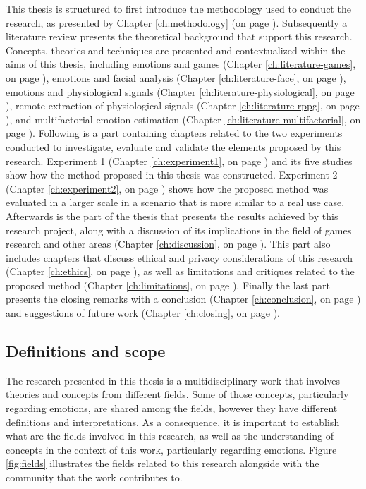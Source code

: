 This thesis is structured to first introduce the methodology used to conduct the research, as presented by Chapter \ref{ch:methodology} (on page \pageref{ch:methodology}). Subsequently a literature review presents the theoretical background that support this research. Concepts, theories and techniques are presented and contextualized within the aims of this thesis, including emotions and games (Chapter \ref{ch:literature-games}, on page \pageref{ch:literature-games}), emotions and facial analysis (Chapter \ref{ch:literature-face}, on page \pageref{ch:literature-face}), emotions and physiological signals (Chapter \ref{ch:literature-physiological}, on page \pageref{ch:literature-physiological}), remote extraction of physiological signals (Chapter \ref{ch:literature-rppg}, on page \pageref{ch:literature-rppg}), and multifactorial emotion estimation (Chapter \ref{ch:literature-multifactorial}, on page \pageref{ch:literature-multifactorial}). Following is a part containing chapters related to the two experiments conducted to investigate, evaluate and validate the elements proposed by this research. Experiment 1 (Chapter \ref{ch:experiment1}, on page \pageref{ch:experiment1}) and its five studies show how the method proposed in this thesis was constructed. Experiment 2 (Chapter \ref{ch:experiment2}, on page \pageref{ch:experiment2}) shows how the proposed method was evaluated in a larger scale in a scenario that is more similar to a real use case. Afterwards is the part of the thesis that presents the results achieved by this research project, along with a discussion of its implications in the field of games research and other areas (Chapter \ref{ch:discussion}, on page \pageref{ch:discussion}). This part also includes chapters that discuss ethical and privacy considerations of this research (Chapter \ref{ch:ethics}, on page \pageref{ch:ethics}), as well as limitations and critiques related to the proposed method (Chapter \ref{ch:limitations}, on page \pageref{ch:limitations}). Finally the last part presents the closing remarks with a conclusion (Chapter \ref{ch:conclusion}, on page \pageref{ch:conclusion}) and suggestions of future work (Chapter \ref{ch:closing}, on page \pageref{ch:closing}).

\subsection{Definitions and scope}

The research presented in this thesis is a multidisciplinary work that involves theories and concepts from different fields. Some of those concepts, particularly regarding emotions, are shared among the fields, however they have different definitions and interpretations. As a consequence, it is important to establish what are the fields involved in this research, as well as the understanding of concepts in the context of this work, particularly regarding emotions. Figure \ref{fig:fields} illustrates the fields related to this research alongside with the community that the work contributes to.

